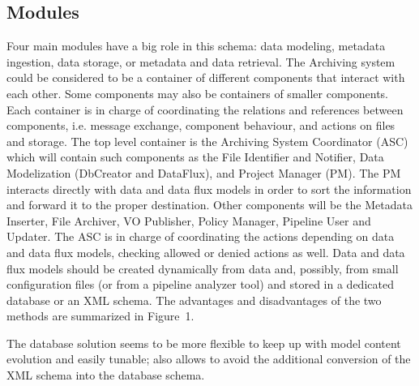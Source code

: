 \subsection{Modules}
Four main modules have a big role in this schema: data modeling, metadata ingestion, data storage, or metadata and data retrieval. The Archiving system could be considered to be a container of different components that interact with each other. Some components may also be containers of smaller components. Each container is in charge of coordinating the relations and references between components, i.e. message exchange, component behaviour, and actions on files and storage. The top level container is the Archiving System Coordinator (ASC) which will contain such components as the File Identifier and Notifier, Data Modelization (DbCreator and DataFlux), and Project Manager (PM). The PM interacts directly with data and data flux models in order to sort the information and forward it to the proper destination. Other components will be the  Metadata Inserter, File Archiver, VO Publisher, Policy Manager, Pipeline User and Updater. The ASC is in charge of coordinating the actions depending on data and data flux models, checking allowed or denied actions as well. Data and data flux models should be created dynamically from data and, possibly, from small configuration files (or from a pipeline analyzer tool) and stored in a dedicated database or an XML schema. The advantages and disadvantages of the two methods are summarized in Figure~1.


The database solution seems to be more flexible to keep up with model content evolution and easily tunable; also allows to avoid the additional conversion of the XML schema into the database schema.

